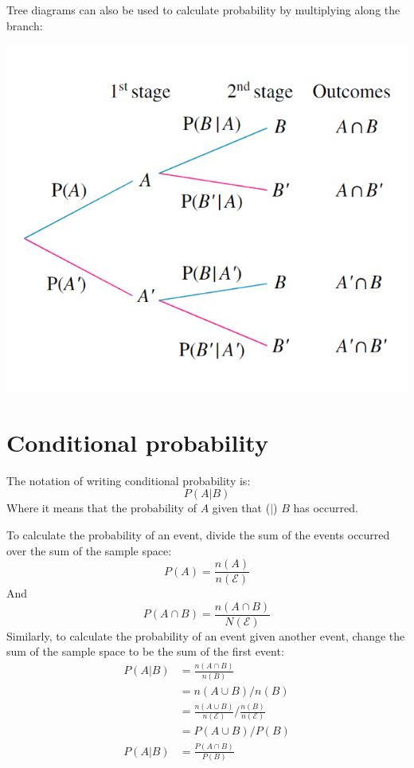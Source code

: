 \documentclass{book}
\begin{document}
Tree diagrams can also be used to calculate probability by multiplying along the branch:
\begin{center}
	\includegraphics[scale=0.5]{tree diagrams probability}
\end{center}

\section{Conditional probability}
The notation of writing conditional probability is:
\[
	P(A|B)
\]
Where it means that the probability of $A$ given that ($|$) $B$ has occurred.

To calculate the probability of an event, divide the sum of the events occurred over the sum of the sample space:
\[
	P(A) = \frac{n(A)}{n(\mathcal{E})}
\]
And
\[
	P(A \cap B) = \frac{n(A \cap B)}{N(\mathcal{E})}
\]
Similarly, to calculate the probability of an event given another event, change the sum of the sample space to be the sum of the first event:
\begin{align*}
	P(A|B) & = \frac{n(A \cap B)}{n(B)}                                         \\
	       & = n(A \cup B) / n(B)                                               \\
	       & = \frac{n(A \cup B)}{n(\mathcal{E})} / \frac{n(B)}{n(\mathcal{E})} \\
	       & = P(A \cup B) / P(B)                                               \\
	P(A|B) & = \frac{P(A \cap B)}{P(B)}
\end{align*}
\end{document}
